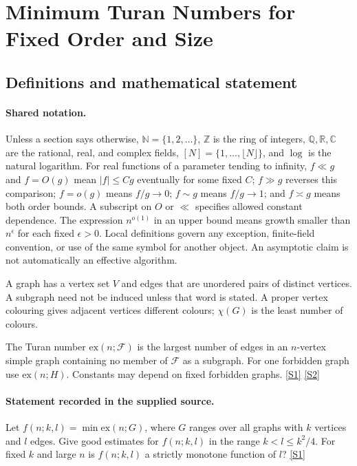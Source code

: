 \documentclass[11pt,a4paper]{article}
\newcommand{\N}{\mathbb{N}}
\newcommand{\Z}{\mathbb{Z}}
\newcommand{\Q}{\mathbb{Q}}
\newcommand{\R}{\mathbb{R}}
\newcommand{\C}{\mathbb{C}}
\newcommand{\sref}[2]{\hyperlink{source:#1:#2}{[S#2]}}
\begin{document}
\section{Minimum Turan Numbers for Fixed Order and Size}\label{statement}


\subsection{Definitions and mathematical statement}

\paragraph{Shared notation.}Unless a section says otherwise, $\N=\{1,2,\ldots\}$,
$\Z$ is the ring of integers, $\Q,\R,\C$ are the rational, real, and complex
fields, $[N]=\{1,\ldots,\lfloor N\rfloor\}$, and $\log$ is the natural
logarithm. For real functions of a parameter tending to infinity,
$f\ll g$ and $f=O(g)$ mean $|f|\leq Cg$ eventually for some fixed $C$;
$f\gg g$ reverses this comparison; $f=o(g)$ means $f/g\to0$;
$f\sim g$ means $f/g\to1$; and $f\asymp g$ means both order bounds.
A subscript on $O$ or $\ll$ specifies allowed constant dependence.
The expression $n^{o(1)}$ in an upper bound means growth smaller than
$n^\epsilon$ for each fixed $\epsilon>0$. Local definitions govern any
exception, finite-field convention, or use of the same symbol for another
object. An asymptotic claim is not automatically an effective algorithm.



A graph has a vertex set $V$ and edges that are unordered pairs of distinct vertices. A subgraph need not be induced unless that word is stated. A proper vertex colouring gives adjacent vertices different colours; $\chi(G)$ is the least number of colours.

The Turan number $\mathrm{ex}(n;\mathcal F)$ is the largest number of edges in an $n$-vertex simple graph containing no member of $\mathcal F$ as a subgraph. For one forbidden graph use $\mathrm{ex}(n;H)$. Constants may depend on fixed forbidden graphs. \sref{statement}{1} \sref{statement}{2}

\paragraph{Statement recorded in the supplied source.}
Let $f(n;k,l)=\min \mathrm{ex}(n;G)$, where $G$ ranges over all graphs with $k$ vertices and $l$ edges.
Give good estimates for $f(n;k,l)$ in the range $k<l\leq k^2/4$. For fixed $k$ and large $n$ is $f(n;k,l)$ a strictly monotone function of $l$? \sref{statement}{1}
\end{document}
